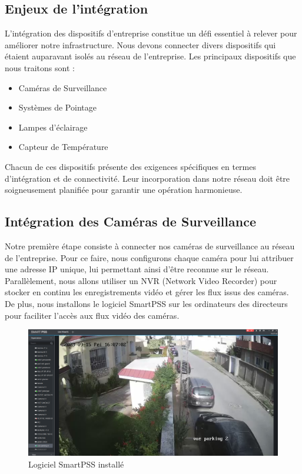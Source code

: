 \subsection{Enjeux de l'intégration}

L'intégration des dispositifs d'entreprise constitue un défi essentiel à relever pour améliorer notre infrastructure. Nous devons connecter divers dispositifs qui étaient auparavant isolés au réseau de l'entreprise. Les principaux dispositifs que nous traitons sont :


\begin{itemize}
\item Caméras de Surveillance

\item Systèmes de Pointage

\item Lampes d'éclairage

\item Capteur de Température
\end{itemize}

Chacun de ces dispositifs présente des exigences spécifiques en termes d'intégration et de connectivité. Leur incorporation dans notre réseau doit être soigneusement planifiée pour garantir une opération harmonieuse.

\subsection{Intégration des Caméras de Surveillance}

Notre première étape consiste à connecter nos caméras de surveillance au réseau de l'entreprise. Pour ce faire, nous configurons chaque caméra pour lui attribuer une adresse IP unique, lui permettant ainsi d'être reconnue sur le réseau. Parallèlement, nous allons utiliser un NVR (Network Video Recorder) pour stocker en continu les enregistrements vidéo et gérer les flux issus des caméras. De plus, nous installons le logiciel SmartPSS sur les ordinateurs des directeurs pour faciliter l'accès aux flux vidéo des caméras.

\begin{figure}[H]
\centering
\includegraphics[width=15cm]{Images/SmartPSS1.png}
\caption{Logiciel SmartPSS installé}
\label{Chap4.2.4}
\end{figure}
\smallskip

